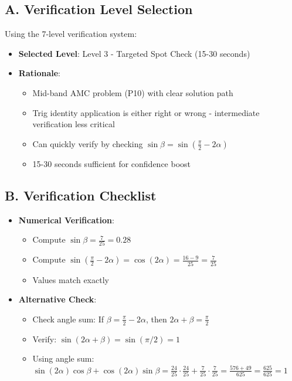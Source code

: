 \documentclass[11pt]{article}
\begin{document}
\begin{verificationbox}
\subsection*{A. Verification Level Selection}

Using the 7-level verification system:

\begin{itemize}[leftmargin=*]
    \item \textbf{Selected Level}: Level 3 - Targeted Spot Check (15-30 seconds)
    \item \textbf{Rationale}: 
    \begin{itemize}
        \item Mid-band AMC problem (P10) with clear solution path
        \item Trig identity application is either right or wrong - intermediate verification less critical
        \item Can quickly verify by checking $\sin\beta = \sin\left(\frac{\pi}{2} - 2\alpha\right)$
        \item 15-30 seconds sufficient for confidence boost
    \end{itemize}
\end{itemize}

\subsection*{B. Verification Checklist}
\begin{itemize}[leftmargin=*]
    \item \textbf{Numerical Verification}: 
    \begin{itemize}
        \item Compute $\sin\beta = \frac{7}{25} = 0.28$
        \item Compute $\sin\left(\frac{\pi}{2} - 2\alpha\right) = \cos(2\alpha) = \frac{16-9}{25} = \frac{7}{25}$ \checkmark
        \item Values match exactly
    \end{itemize}
    
    \item \textbf{Alternative Check}: 
    \begin{itemize}
        \item Check angle sum: If $\beta = \frac{\pi}{2} - 2\alpha$, then $2\alpha + \beta = \frac{\pi}{2}$
        \item Verify: $\sin(2\alpha + \beta) = \sin(\pi/2) = 1$
        \item Using angle sum: $\sin(2\alpha)\cos\beta + \cos(2\alpha)\sin\beta = \frac{24}{25} \cdot \frac{24}{25} + \frac{7}{25} \cdot \frac{7}{25} = \frac{576 + 49}{625} = \frac{625}{625} = 1$ \checkmark
    \end{itemize}
    

\end{itemize}
\end{verificationbox}
\end{document}
